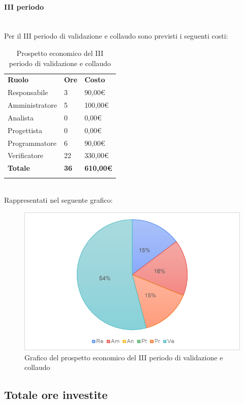 \paragraph{III periodo} \mbox{} \\
Per il III periodo di validazione e collaudo sono previsti i seguenti costi:
\begin{longtable} {
		>{}p{32mm}
		>{}p{20mm}
		>{}p{20mm}
	}
	\rowcolor{gray!50}
	
	\textbf{Ruolo} & \textbf{Ore} & \textbf{Costo} \TBstrut \\
	Responsabile & 3 & 90,00\euro{} \TBstrut \\
	Amministratore & 5 & 100,00\euro{} \TBstrut \\
	Analista & 0 & 0,00\euro{} \TBstrut \\
	Progettista & 0 & 0,00\euro{}\TBstrut \\
	Programmatore & 6 & 90,00\euro{} \TBstrut \\
	Verificatore & 22 & 330,00\euro{} \TBstrut \\
	\textbf{Totale} & \textbf{36}& \textbf{610,00\euro{}} \TBstrut \\	
	\rowcolor{white}
	\caption{Prospetto economico del III periodo di validazione e collaudo}
\end{longtable} \mbox{} \\
Rappresentati nel seguente grafico: \mbox{}
\begin{figure} [H]
	\includegraphics[width=\linewidth]{./img/Grafici/ra6.png}
	\caption{Grafico del prospetto economico del III periodo di validazione e collaudo}
\end{figure}

\subsection{Totale ore investite}
